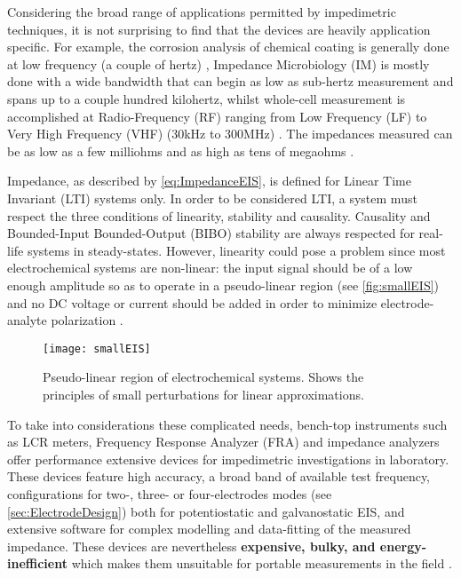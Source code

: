 Considering the broad range of applications permitted by impedimetric techniques, it is not surprising to find that the devices are heavily application specific. For example, the corrosion analysis of chemical coating is generally done at low frequency (a couple of hertz) \cite{Sawhney2019}, Impedance Microbiology (IM) is mostly done with a wide bandwidth that can begin as low as sub-hertz measurement and spans up to a couple hundred kilohertz, whilst whole-cell measurement is accomplished at Radio-Frequency (RF) ranging from Low Frequency (LF) to Very High Frequency (VHF) (30kHz to 300MHz) \cite{Xu2016,Opitz2019}. The impedances measured can be as low as a few milliohms and as high as tens of megaohms \cite{Grossi2017}. \par

Impedance, as described by \autoref{eq:ImpedanceEIS}, is defined for Linear Time Invariant (LTI) systems only. In order to be considered LTI, a system must respect the three conditions of linearity, stability and causality. Causality and Bounded-Input Bounded-Output (BIBO) stability are always respected for real-life systems in steady-states. However, linearity could pose a problem since most electrochemical systems are non-linear: the input signal should be of a low enough amplitude so as to operate in a pseudo-linear region (see \autoref{fig:smallEIS}) and no DC voltage or current should be added in order to minimize electrode-analyte polarization \cite{Grossi2017,Xu2016}. \par
\begin{figure}[ht]
    \centering
    \texttt{[image: smallEIS]}
    \caption{Pseudo-linear region of electrochemical systems. Shows the principles of small perturbations for linear approximations.}
    \label{fig:smallEIS}
\end{figure}

To take into considerations these complicated needs, bench-top instruments such as LCR meters, Frequency Response Analyzer (FRA) and impedance analyzers offer performance extensive devices for impedimetric investigations in laboratory. These devices feature high accuracy, a broad band of available test frequency, configurations for two-, three- or four-electrodes modes (see \autoref{sec:ElectrodeDesign}) both for potentiostatic and galvanostatic EIS, and extensive software for complex modelling and data-fitting of the measured impedance. These devices are nevertheless \textbf{expensive, bulky, and energy-inefficient} which makes them unsuitable for portable measurements in the field \cite{Grossi2017,Chowdhury2017,Sawhney2019}. 